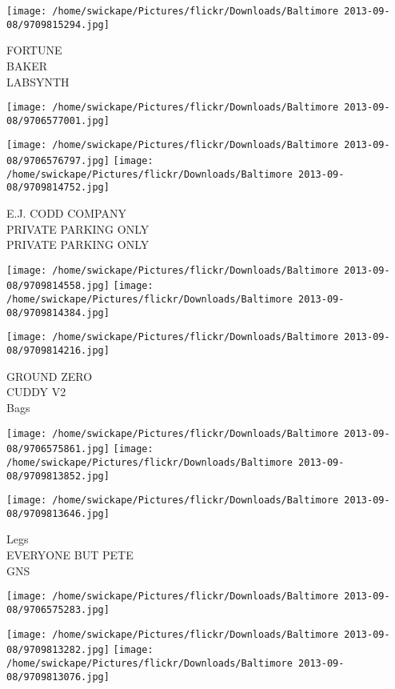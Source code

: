 \documentclass[10pt,letterpaper]{article}
\begin{document}
\texttt{[image: /home/swickape/Pictures/flickr/Downloads/Baltimore 2013-09-08/9709815294.jpg]}

FORTUNE\\
BAKER\\
LABSYNTH
\pagebreak

\texttt{[image: /home/swickape/Pictures/flickr/Downloads/Baltimore 2013-09-08/9706577001.jpg]}

\vspace{0.25in}
\texttt{[image: /home/swickape/Pictures/flickr/Downloads/Baltimore 2013-09-08/9706576797.jpg]}
\texttt{[image: /home/swickape/Pictures/flickr/Downloads/Baltimore 2013-09-08/9709814752.jpg]}

E.J. CODD COMPANY\\
PRIVATE PARKING ONLY\\
PRIVATE PARKING ONLY
\pagebreak

\texttt{[image: /home/swickape/Pictures/flickr/Downloads/Baltimore 2013-09-08/9709814558.jpg]}
\texttt{[image: /home/swickape/Pictures/flickr/Downloads/Baltimore 2013-09-08/9709814384.jpg]}

\vspace{0.25in}
\texttt{[image: /home/swickape/Pictures/flickr/Downloads/Baltimore 2013-09-08/9709814216.jpg]}

GROUND ZERO\\
CUDDY V2\\
Bags
\pagebreak

\texttt{[image: /home/swickape/Pictures/flickr/Downloads/Baltimore 2013-09-08/9706575861.jpg]}
\texttt{[image: /home/swickape/Pictures/flickr/Downloads/Baltimore 2013-09-08/9709813852.jpg]}

\texttt{[image: /home/swickape/Pictures/flickr/Downloads/Baltimore 2013-09-08/9709813646.jpg]}

Legs\\
EVERYONE BUT PETE\\
GNS
\pagebreak

\texttt{[image: /home/swickape/Pictures/flickr/Downloads/Baltimore 2013-09-08/9706575283.jpg]}

\vspace{0.25in}
\texttt{[image: /home/swickape/Pictures/flickr/Downloads/Baltimore 2013-09-08/9709813282.jpg]}
\texttt{[image: /home/swickape/Pictures/flickr/Downloads/Baltimore 2013-09-08/9709813076.jpg]}
\end{document}
